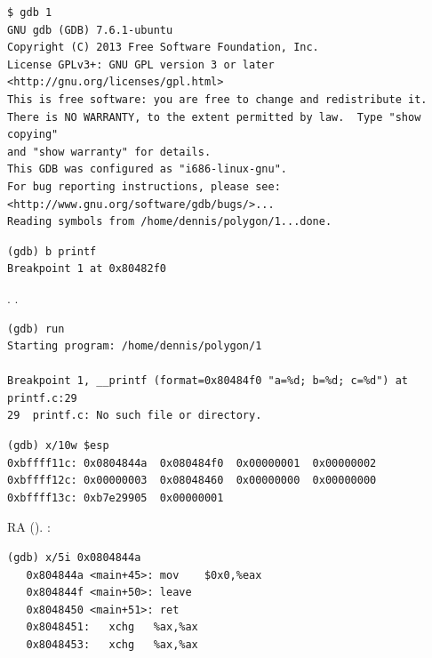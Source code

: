 \begin{lstlisting}
$ gdb 1
GNU gdb (GDB) 7.6.1-ubuntu
Copyright (C) 2013 Free Software Foundation, Inc.
License GPLv3+: GNU GPL version 3 or later <http://gnu.org/licenses/gpl.html>
This is free software: you are free to change and redistribute it.
There is NO WARRANTY, to the extent permitted by law.  Type "show copying"
and "show warranty" for details.
This GDB was configured as "i686-linux-gnu".
For bug reporting instructions, please see:
<http://www.gnu.org/software/gdb/bugs/>...
Reading symbols from /home/dennis/polygon/1...done.
\end{lstlisting}

\begin{lstlisting}[caption=\RU{установим точку останова на}\EN{let's set breakpoint on} \printf]
(gdb) b printf
Breakpoint 1 at 0x80482f0
\end{lstlisting}

.
 \printf%
.

\begin{lstlisting}
(gdb) run
Starting program: /home/dennis/polygon/1 

Breakpoint 1, __printf (format=0x80484f0 "a=%d; b=%d; c=%d") at printf.c:29
29	printf.c: No such file or directory.
\end{lstlisting}


\begin{lstlisting}
(gdb) x/10w $esp
0xbffff11c:	0x0804844a	0x080484f0	0x00000001	0x00000002
0xbffff12c:	0x00000003	0x08048460	0x00000000	0x00000000
0xbffff13c:	0xb7e29905	0x00000001
\end{lstlisting}

 \ac{RA} ().
:

\begin{lstlisting}[label=NOP_as_XCHG_example]
(gdb) x/5i 0x0804844a
   0x804844a <main+45>:	mov    $0x0,%eax
   0x804844f <main+50>:	leave  
   0x8048450 <main+51>:	ret    
   0x8048451:	xchg   %ax,%ax
   0x8048453:	xchg   %ax,%ax
\end{lstlisting}

